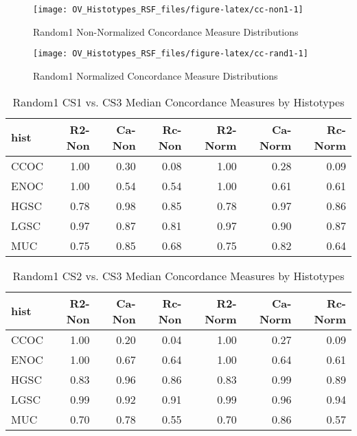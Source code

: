 \documentclass[
]{report}
\begin{document}
\begin{figure}[H]

{\centering \texttt{[image: OV\_Histotypes\_RSF\_files/figure-latex/cc-non1-1]} 

}

\caption{Random1 Non-Normalized Concordance Measure Distributions}\label{fig:cc-non1}
\end{figure}

\begin{figure}[H]

{\centering \texttt{[image: OV\_Histotypes\_RSF\_files/figure-latex/cc-rand1-1]} 

}

\caption{Random1 Normalized Concordance Measure Distributions}\label{fig:cc-rand1}
\end{figure}

\begin{table}

\caption{\label{tab:rand1-cs1-vs-cs3}Random1 CS1 vs. CS3 Median Concordance Measures by Histotypes}
\centering
\begin{tabular}[t]{l|r|r|r|r|r|r}
\hline
hist & R2-Non & Ca-Non & Rc-Non & R2-Norm & Ca-Norm & Rc-Norm\\
\hline
CCOC & 1.00 & 0.30 & 0.08 & 1.00 & 0.28 & 0.09\\
\hline
ENOC & 1.00 & 0.54 & 0.54 & 1.00 & 0.61 & 0.61\\
\hline
HGSC & 0.78 & 0.98 & 0.85 & 0.78 & 0.97 & 0.86\\
\hline
LGSC & 0.97 & 0.87 & 0.81 & 0.97 & 0.90 & 0.87\\
\hline
MUC & 0.75 & 0.85 & 0.68 & 0.75 & 0.82 & 0.64\\
\hline
\end{tabular}
\end{table}

\begin{table}

\caption{\label{tab:rand1-cs2-vs-cs3}Random1 CS2 vs. CS3 Median Concordance Measures by Histotypes}
\centering
\begin{tabular}[t]{l|r|r|r|r|r|r}
\hline
hist & R2-Non & Ca-Non & Rc-Non & R2-Norm & Ca-Norm & Rc-Norm\\
\hline
CCOC & 1.00 & 0.20 & 0.04 & 1.00 & 0.27 & 0.09\\
\hline
ENOC & 1.00 & 0.67 & 0.64 & 1.00 & 0.64 & 0.61\\
\hline
HGSC & 0.83 & 0.96 & 0.86 & 0.83 & 0.99 & 0.89\\
\hline
LGSC & 0.99 & 0.92 & 0.91 & 0.99 & 0.96 & 0.94\\
\hline
MUC & 0.70 & 0.78 & 0.55 & 0.70 & 0.86 & 0.57\\
\hline
\end{tabular}
\end{table}
\end{document}
